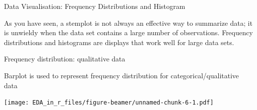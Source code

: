 \documentclass[ignorenonframetext,]{beamer}
\newenvironment{Shaded}{\begin{snugshade}}{\end{snugshade}}
\newcommand{\KeywordTok}[1]{\textcolor[rgb]{0.13,0.29,0.53}{\textbf{#1}}}
\newcommand{\DataTypeTok}[1]{\textcolor[rgb]{0.13,0.29,0.53}{#1}}
\newcommand{\StringTok}[1]{\textcolor[rgb]{0.31,0.60,0.02}{#1}}
\newcommand{\OperatorTok}[1]{\textcolor[rgb]{0.81,0.36,0.00}{\textbf{#1}}}
\newcommand{\NormalTok}[1]{#1}
\begin{document}
\begin{frame}{Data Visualisation: Frequency Distributions and Histogram}

As you have seen, a stemplot is not always an effective way to summarize
data; it is unwieldy when the data set contains a large number of
observations. Frequency distributions and histograms are displays that
work well for large data sets.

\end{frame}

\begin{frame}[fragile]{Frequency distribution: qualitative data}

Barplot is used to represent frequency distribution for
categorical/qualitative data

\begin{Shaded}
\end{Shaded}

\texttt{[image: EDA\_in\_r\_files/figure-beamer/unnamed-chunk-6-1.pdf]}

\end{frame}
\end{document}
